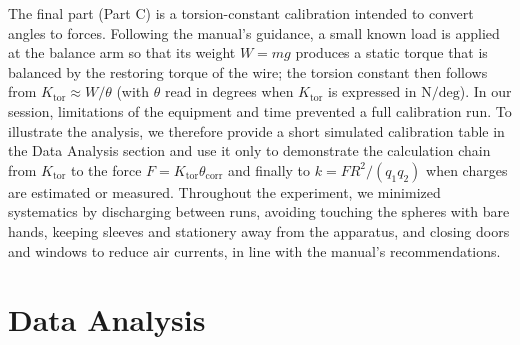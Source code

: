 \documentclass[12pt]{article}
\begin{document}
The final part (Part C) is a torsion-constant calibration intended to convert angles to forces. Following the manual’s guidance, a small known load is applied at the balance arm so that its weight \(W=mg\) produces a static torque that is balanced by the restoring torque of the wire; the torsion constant then follows from \(K_{\mathrm{tor}}\approx W/\theta\) (with \(\theta\) read in degrees when \(K_{\mathrm{tor}}\) is expressed in \(\mathrm{N/deg}\)). In our session, limitations of the equipment and time prevented a full calibration run. To illustrate the analysis, we therefore provide a short simulated calibration table in the Data Analysis section and use it only to demonstrate the calculation chain from \(K_{\mathrm{tor}}\) to the force \(F=K_{\mathrm{tor}}\theta_{\mathrm{corr}}\) and finally to \(k = F R^2/(q_1 q_2)\) when charges are estimated or measured. Throughout the experiment, we minimized systematics by discharging between runs, avoiding touching the spheres with bare hands, keeping sleeves and stationery away from the apparatus, and closing doors and windows to reduce air currents, in line with the manual’s recommendations.


\section*{Data Analysis}
\end{document}
